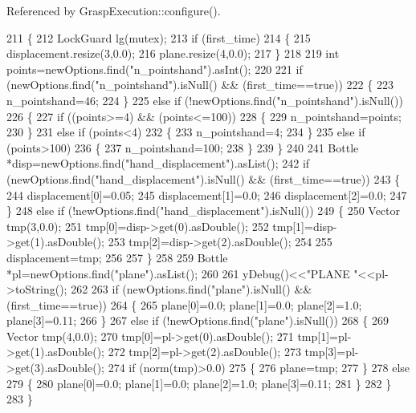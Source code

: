 Referenced by Grasp\+Execution\+::configure().


\begin{DoxyCode}
211 \{
212     LockGuard lg(mutex);
213     \textcolor{keywordflow}{if} (first\_time)
214     \{
215         displacement.resize(3,0.0);
216         plane.resize(4,0.0);
217     \}
218 
219     \textcolor{keywordtype}{int} points=newOptions.find(\textcolor{stringliteral}{"n\_pointshand"}).asInt();
220 
221     \textcolor{keywordflow}{if} (newOptions.find(\textcolor{stringliteral}{"n\_pointshand"}).isNull() && (first\_time==\textcolor{keyword}{true}))
222     \{
223         n\_pointshand=46;
224     \}
225     \textcolor{keywordflow}{else} \textcolor{keywordflow}{if} (!newOptions.find(\textcolor{stringliteral}{"n\_pointshand"}).isNull())
226     \{
227         \textcolor{keywordflow}{if} ((points>=4) && (points<=100))
228         \{
229             n\_pointshand=points;
230         \}
231         \textcolor{keywordflow}{else} \textcolor{keywordflow}{if} (points<4)
232         \{
233             n\_pointshand=4;
234         \}
235         \textcolor{keywordflow}{else} \textcolor{keywordflow}{if} (points>100)
236         \{
237             n\_pointshand=100;
238         \}
239     \}
240 
241     Bottle *disp=newOptions.find(\textcolor{stringliteral}{"hand\_displacement"}).asList();
242     \textcolor{keywordflow}{if} (newOptions.find(\textcolor{stringliteral}{"hand\_displacement"}).isNull() && (first\_time==\textcolor{keyword}{true}))
243     \{
244         displacement[0]=0.05;
245         displacement[1]=0.0;
246         displacement[2]=0.0;
247     \}
248     \textcolor{keywordflow}{else} \textcolor{keywordflow}{if} (!newOptions.find(\textcolor{stringliteral}{"hand\_displacement"}).isNull())
249     \{
250         Vector tmp(3,0.0);
251         tmp[0]=disp->get(0).asDouble();
252         tmp[1]=disp->get(1).asDouble();
253         tmp[2]=disp->get(2).asDouble();
254 
255         displacement=tmp;
256 
257     \}
258 
259     Bottle *pl=newOptions.find(\textcolor{stringliteral}{"plane"}).asList();
260 
261     yDebug()<<\textcolor{stringliteral}{"PLANE "}<<pl->toString();
262 
263     \textcolor{keywordflow}{if} (newOptions.find(\textcolor{stringliteral}{"plane"}).isNull() && (first\_time==\textcolor{keyword}{true}))
264     \{
265         plane[0]=0.0; plane[1]=0.0; plane[2]=1.0; plane[3]=0.11;
266     \}
267     \textcolor{keywordflow}{else} \textcolor{keywordflow}{if} (!newOptions.find(\textcolor{stringliteral}{"plane"}).isNull())
268     \{
269         Vector tmp(4,0.0);
270         tmp[0]=pl->get(0).asDouble();
271         tmp[1]=pl->get(1).asDouble();
272         tmp[2]=pl->get(2).asDouble();
273         tmp[3]=pl->get(3).asDouble();
274         \textcolor{keywordflow}{if} (norm(tmp)>0.0)
275         \{
276             plane=tmp;
277         \}
278         \textcolor{keywordflow}{else}
279         \{
280             plane[0]=0.0; plane[1]=0.0; plane[2]=1.0; plane[3]=0.11;
281         \}
282     \}
283 \}
\end{DoxyCode}
